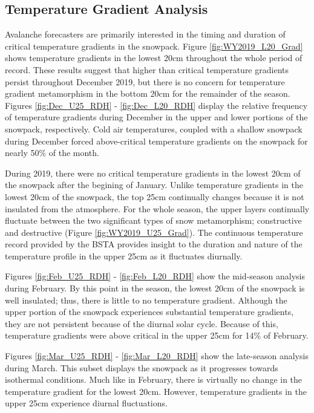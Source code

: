 \subsection{Temperature Gradient Analysis}
Avalanche forecasters are primarily interested in the timing and duration of critical temperature gradients in the snowpack. Figure \ref{fig:WY2019_L20_Grad} shows temperature gradients in the lowest 20cm throughout the whole period of record. These results suggest that higher than critical temperature gradients persist throughout December 2019, but there is no concern for temperature gradient metamorphism in the bottom 20cm for the remainder of the season. Figures \ref{fig:Dec_U25_RDH} - \ref{fig:Dec_L20_RDH} display the relative frequency of temperature gradients during December in the upper and lower portions of the snowpack, respectively. Cold air temperatures, coupled with a shallow snowpack during December forced above-critical temperature gradients on the snowpack for nearly 50\% of the month. 

During 2019, there were no critical temperature gradients in the lowest 20cm of the snowpack after the begining of January. Unlike temperature gradients in the lowest 20cm of the snowpack, the top 25cm continually changes because it is not insulated from the atmosphere. For the whole season, the upper layers continually fluctuate between the two significant types of snow metamorphism; constructive and destructive (Figure \ref{fig:WY2019_U25_Grad}). The continuous temperature record provided by the BSTA provides insight to the duration and nature of the temperature profile in the upper 25cm as it fluctuates diurnally.  

Figures  \ref{fig:Feb_U25_RDH} - \ref{fig:Feb_L20_RDH} show the mid-season analysis during February. By this point in the season, the lowest 20cm of the snowpack is well insulated; thus, there is little to no temperature gradient. Although the upper portion of the snowpack experiences substantial temperature gradients, they are not persistent because of the diurnal solar cycle. Because of this, temperature gradients were above critical in the upper 25cm for 14\% of February. 

Figures \ref{fig:Mar_U25_RDH} - \ref{fig:Mar_L20_RDH} show the late-season analysis during March. This subset displays the snowpack as it progresses towards isothermal conditions.  Much like in February, there is virtually no change in the temperature gradient for the lowest 20cm. However, temperature gradients in the upper 25cm experience diurnal fluctuations.

